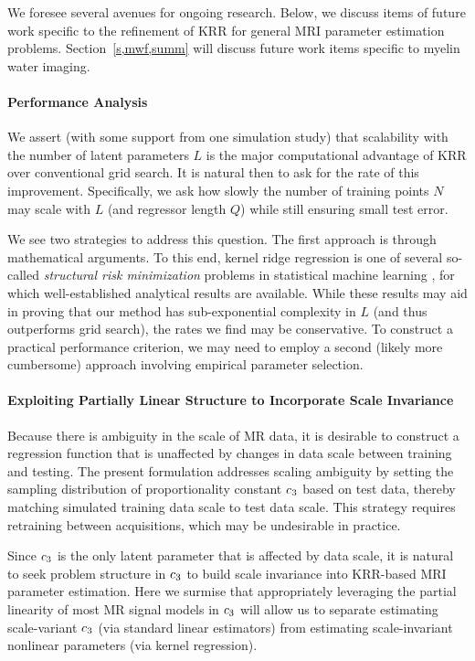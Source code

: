 We foresee several avenues for ongoing research.
Below, we discuss items of future work 
specific to the refinement of KRR 
for general MRI parameter estimation problems.
Section~\ref{s,mwf,summ} will discuss
future work items specific to myelin water imaging.

\paragraph{Performance Analysis}
We assert 
(with some support from one simulation study)
that scalability
with the number of latent parameters $L$
is the major computational advantage
of KRR over conventional grid search.
It is natural then to ask
for the rate of this improvement.
Specifically,
we ask how slowly the number
of training points $N$ may scale 
with $L$ (and regressor length $Q$) 
while still ensuring small test error.

We see two strategies to address this question.
The first approach 
is through mathematical arguments.
To this end,
kernel ridge regression
is one of several so-called 
\emph{structural risk minimization} problems
in statistical machine learning \cite{cortes:95:svn},
for which well-established analytical results are available.
While these results may aid 
in proving that our method 
has sub-exponential complexity in $L$
(and thus outperforms grid search),
the rates we find may be conservative.
To construct a practical performance criterion,
we may need to employ a second 
(likely more cumbersome) approach
involving empirical parameter selection.

\paragraph{Exploiting Partially Linear Structure to Incorporate Scale Invariance}
Because there is ambiguity
in the scale of MR data,
it is desirable
to construct a regression function
that is unaffected
by changes in data scale 
between training and testing.
The present formulation 
addresses scaling ambiguity
by setting the sampling distribution
of proportionality constant $c_{3}$
based on test data,
thereby matching simulated training data scale
to test data scale.
This strategy requires retraining 
between acquisitions,
which may be undesirable in practice.

Since $c_{3}$ is the only latent parameter
that is affected by data scale,
it is natural
to seek problem structure
in $c_{3}$ 
to build scale invariance
into KRR-based MRI parameter estimation.
Here we surmise 
that appropriately leveraging the partial linearity
of most MR signal models in $c_{3}$
will allow us
to separate estimating scale-variant $c_{3}$
(via standard linear estimators)
from estimating scale-invariant nonlinear parameters
(via kernel regression).

